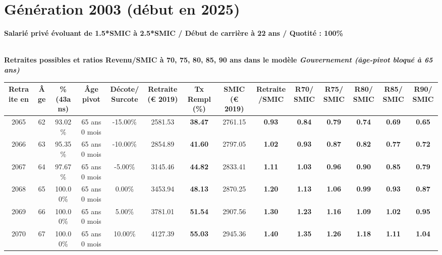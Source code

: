 \section{Génération 2003 (début en 2025)\label{Ascendant1525_100_2003_22_0}} 
 
{\bf \noindent Salarié privé évoluant de 1.5*SMIC à 2.5*SMIC / Début de carrière à 22 ans / Quotité : 100\%}  ~ 

 ~\\{\bf \noindent Retraites possibles et ratios Revenu/SMIC à 70, 75, 80, 85, 90 ans dans le modèle \emph{Gouvernement (âge-pivot bloqué à 65 ans)}}  
 
\begin{adjustbox}{max width=\textwidth} 
\begin{tabular}[htb]{|c|c||c|c|c||c|c||c|c||c|c|c|c|c|} 
\hline 
 Retraite en &  Âge &  \%(43ans) &  Âge pivot &  Décote/Surcote &  Retraite (\euro{} 2019) &  Tx Rempl(\%) &  SMIC (\euro{} 2019) &  Retraite/SMIC &  R70/SMIC &  R75/SMIC &  R80/SMIC &  R85/SMIC &  R90/SMIC \\ 
\hline \hline 
 2065 &  62 &  93.02\% &  65 ans 0 mois &  -15.00\% &  2581.53 &  {\bf 38.47} &  2761.15 &  {\bf {\color{red} 0.93}} &  {\bf {\color{red} 0.84}} &  {\bf {\color{red} 0.79}} &  {\bf {\color{red} 0.74}} &  {\bf {\color{red} 0.69}} &  {\bf {\color{red} 0.65}} \\ 
\hline 
 2066 &  63 &  95.35\% &  65 ans 0 mois &  -10.00\% &  2854.89 &  {\bf 41.60} &  2797.05 &  {\bf 1.02} &  {\bf {\color{red} 0.93}} &  {\bf {\color{red} 0.87}} &  {\bf {\color{red} 0.82}} &  {\bf {\color{red} 0.77}} &  {\bf {\color{red} 0.72}} \\ 
\hline 
 2067 &  64 &  97.67\% &  65 ans 0 mois &  -5.00\% &  3145.46 &  {\bf 44.82} &  2833.41 &  {\bf 1.11} &  {\bf 1.03} &  {\bf {\color{red} 0.96}} &  {\bf {\color{red} 0.90}} &  {\bf {\color{red} 0.85}} &  {\bf {\color{red} 0.79}} \\ 
\hline 
 2068 &  65 &  100.00\% &  65 ans 0 mois &  0.00\% &  3453.94 &  {\bf 48.13} &  2870.25 &  {\bf 1.20} &  {\bf 1.13} &  {\bf 1.06} &  {\bf {\color{red} 0.99}} &  {\bf {\color{red} 0.93}} &  {\bf {\color{red} 0.87}} \\ 
\hline 
 2069 &  66 &  100.00\% &  65 ans 0 mois &  5.00\% &  3781.01 &  {\bf 51.54} &  2907.56 &  {\bf 1.30} &  {\bf 1.23} &  {\bf 1.16} &  {\bf 1.09} &  {\bf 1.02} &  {\bf {\color{red} 0.95}} \\ 
\hline 
 2070 &  67 &  100.00\% &  65 ans 0 mois &  10.00\% &  4127.39 &  {\bf 55.03} &  2945.36 &  {\bf 1.40} &  {\bf 1.35} &  {\bf 1.26} &  {\bf 1.18} &  {\bf 1.11} &  {\bf 1.04} \\ 
\hline 
\hline 
\end{tabular} 
\end{adjustbox} 
 
